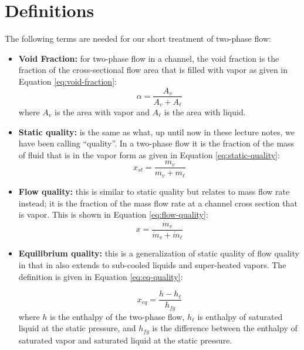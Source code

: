 \section{Definitions}
The following terms are needed for our short treatment of two-phase flow:

\begin{itemize}
\item \textbf{Void Fraction:} for two-phase flow in a channel, the void fraction is the fraction of the cross-sectional flow area that is filled with vapor as given in Equation \ref{eq:void-fraction}:
\begin{equation}
\alpha = \frac{A_{v}}{A_{v}+A_{\ell}}
\label{eq:void-fraction}
\end{equation}
where $A_{v}$ is the area with vapor and $A_{\ell}$ is the area with liquid.

\item \textbf{Static quality:} is the same as what, up until now in these lecture notes, we have been calling ``quality''.  In a two-phase flow it is the fraction of the mass of fluid that is in the vapor form as given in Equation \ref{eq:static-quality}:
\begin{equation}
x_{st} = \frac{m_{v}}{m_v + m_{\ell}}
\label{eq:static-quality}
\end{equation}

\item \textbf{Flow quality:} this is similar to static quality but relates to mass flow rate instead; it is the fraction of the mass flow rate at a channel cross section that is vapor.  This is shown in Equation \ref{eq:flow-quality}:
\begin{equation}
x = \frac{\dot{m}_{v}}{\dot{m}_{v} + \dot{m}_{\ell}}
\label{eq:flow-quality}
\end{equation}

\item \textbf{Equilibrium quality:} this is a generalization of static quality of flow quality in that in also extends to sub-cooled liquids and super-heated vapors.  The definition is given in Equation \ref{eq:eq-quality}:

\begin{equation}
x_{eq} = \frac{h - h_{\ell}}{h_{fg}}
\label{eq:eq-quality}
\end{equation}
where $h$ is the enthalpy of the two-phase flow, $h_{\ell}$ is enthalpy of saturated liquid at the static pressure, and $h_{fg}$ is the difference between the enthalpy of saturated vapor and saturated liquid at the static pressure.


\end{itemize}

